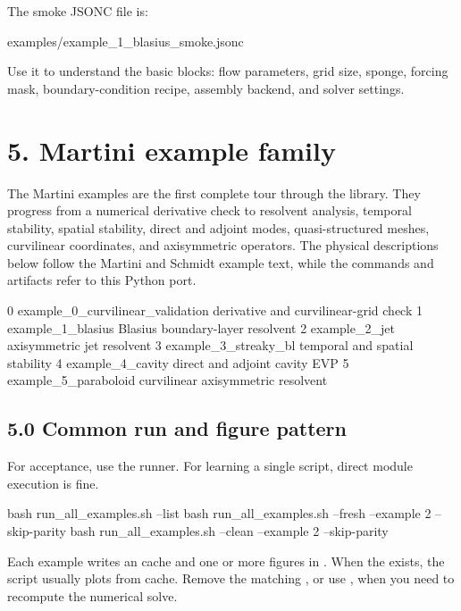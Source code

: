 \documentclass[11pt,a4paper]{article}
\newcommand{\code}[1]{\texttt{\detokenize{#1}}}
\begin{document}
The smoke JSONC file is:

\begin{outputbox}
examples/example_1_blasius_smoke.jsonc
\end{outputbox}

Use it to understand the basic blocks: flow parameters, grid size, sponge, forcing mask, boundary-condition recipe, assembly backend, and solver settings.

\section*{5. Martini example family}

The Martini examples are the first complete tour through the library. They progress from a numerical derivative check to resolvent analysis, temporal stability, spatial stability, direct and adjoint modes, quasi-structured meshes, curvilinear coordinates, and axisymmetric operators. The physical descriptions below follow the Martini and Schmidt example text, while the commands and artifacts refer to this Python port.

\begin{outputbox}
0  example_0_curvilinear_validation  derivative and curvilinear-grid check
1  example_1_blasius                 Blasius boundary-layer resolvent
2  example_2_jet                     axisymmetric jet resolvent
3  example_3_streaky_bl              temporal and spatial stability
4  example_4_cavity                  direct and adjoint cavity EVP
5  example_5_paraboloid              curvilinear axisymmetric resolvent
\end{outputbox}

\subsection*{5.0 Common run and figure pattern}

For acceptance, use the runner. For learning a single script, direct module execution is fine.

\begin{commandbox}
bash run_all_examples.sh --list
bash run_all_examples.sh --fresh --example 2 --skip-parity
bash run_all_examples.sh --clean --example 2 --skip-parity
\end{commandbox}

Each example writes an \code{.npz} cache and one or more \code{.png} figures in . When the \code{.npz} exists, the script usually plots from cache. Remove the matching \code{.npz}, or use \code{--clean}, when you need to recompute the numerical solve.
\end{document}
